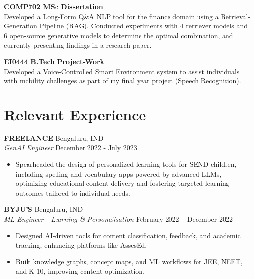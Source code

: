 \documentclass[a4paper,9pt]{article} %
\begin{document}
\textbf{COMP702 MSc Dissertation} \\
Developed a Long-Form Q\&A NLP tool for the finance domain using a Retrieval-Generation Pipeline (RAG). Conducted experiments with 4 retriever models and 6 open-source generative models to determine the optimal combination, and currently presenting findings in a research paper.

\vspace{0.1cm}

\textbf{EI0444 B.Tech Project-Work} \\
Developed a Voice-Controlled Smart Environment system to assist individuals with mobility challenges as part of my final year project (Speech Recognition). 

\section*{Relevant Experience}


\vspace{0.1cm}

\textbf{FREELANCE} \hfill Bengaluru, IND \\
\textit{GenAI Engineer} \hfill December 2022 - July 2023
\begin{itemize}[left=0pt, itemsep=0pt]
\item Spearheaded the design of personalized learning tools for SEND children, including spelling and vocabulary apps powered by advanced LLMs, optimizing educational content delivery and fostering targeted learning outcomes tailored to individual needs.

\end{itemize}

\vspace{0.1cm}

\textbf{BYJU'S} \hfill Bengaluru, IND \\
\textit{ML Engineer -  Learning \& Personalisation} \hfill February 2022 – December 2022
\begin{itemize}[left=0pt, itemsep=0pt]
    \item Designed AI-driven tools for content classification, feedback, and academic tracking, enhancing platforms like AssesEd.
    \item Built knowledge graphs, concept maps, and ML workflows for JEE, NEET, and K-10, improving content optimization.
\end{itemize}
\end{document}
